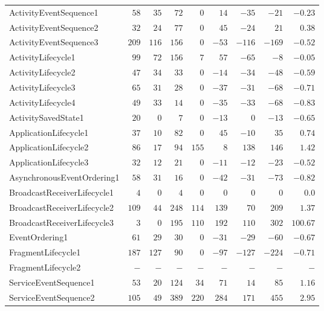 \documentclass[../draft.tex]{subfiles}
\begin{document}
\begin{longtable}{l | r | r | r | r | r | r | r | r}
        ActivityEventSequence1 & $58$ & $35$ & $72$ & $0$ & $14$ & $-35$ & $-21$ & $-0.23$\\
        ActivityEventSequence2 & $32$ & $24$ & $77$ & $0$ & $45$ & $-24$ & $21$ & $0.38$\\
        ActivityEventSequence3 & $209$ & $116$ & $156$ & $0$ & $-53$ & $-116$ & $-169$ & $-0.52$\\
        ActivityLifecycle1 & $99$ & $72$ & $156$ & $7$ & $57$ & $-65$ & $-8$ & $-0.05$\\
        ActivityLifecycle2 & $47$ & $34$ & $33$ & $0$ & $-14$ & $-34$ & $-48$ & $-0.59$\\
        ActivityLifecycle3 & $65$ & $31$ & $28$ & $0$ & $-37$ & $-31$ & $-68$ & $-0.71$\\
        ActivityLifecycle4 & $49$ & $33$ & $14$ & $0$ & $-35$ & $-33$ & $-68$ & $-0.83$\\
        ActivitySavedState1 & $20$ & $0$ & $7$ & $0$ & $-13$ & $0$ & $-13$ & $-0.65$\\
        ApplicationLifecycle1 & $37$ & $10$ & $82$ & $0$ & $45$ & $-10$ & $35$ & $0.74$\\
        ApplicationLifecycle2 & $86$ & $17$ & $94$ & $155$ & $8$ & $138$ & $146$ & $1.42$\\
        ApplicationLifecycle3 & $32$ & $12$ & $21$ & $0$ & $-11$ & $-12$ & $-23$ & $-0.52$\\
        AsynchronousEventOrdering1 & $58$ & $31$ & $16$ & $0$ & $-42$ & $-31$ & $-73$ & $-0.82$\\
        BroadcastReceiverLifecycle1 & $4$ & $0$ & $4$ & $0$ & $0$ & $0$ & $0$ & $0.0$\\
        BroadcastReceiverLifecycle2 & $109$ & $44$ & $248$ & $114$ & $139$ & $70$ & $209$ & $1.37$\\
        BroadcastReceiverLifecycle3 & $3$ & $0$ & $195$ & $110$ & $192$ & $110$ & $302$ & $100.67$\\
        EventOrdering1 & $61$ & $29$ & $30$ & $0$ & $-31$ & $-29$ & $-60$ & $-0.67$\\
        FragmentLifecycle1 & $187$ & $127$ & $90$ & $0$ & $-97$ & $-127$ & $-224$ & $-0.71$\\
        FragmentLifecycle2 & $-$ & $-$ & $-$ & $-$ & $-$ & $-$ & $-$ & $-$\\
        ServiceEventSequence1 & $53$ & $20$ & $124$ & $34$ & $71$ & $14$ & $85$ & $1.16$\\
        ServiceEventSequence2 & $105$ & $49$ & $389$ & $220$ & $284$ & $171$ & $455$ & $2.95$\\

\end{longtable}
\end{document}
